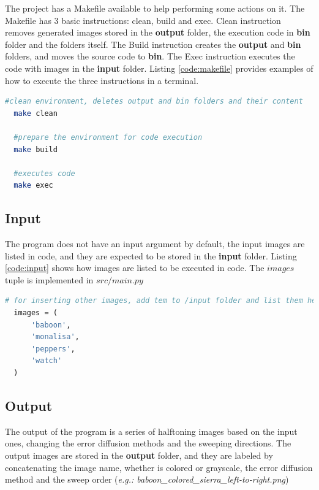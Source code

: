 \documentclass[]{IEEEtran}
\begin{document}
The project has a Makefile available to help performing some actions on it. The Makefile has 3 basic instructions: clean, build and exec. Clean instruction removes generated images stored in the \textbf{output} folder, the execution code in \textbf{bin} folder and the folders itself. The Build instruction creates the \textbf{output} and \textbf{bin} folders, and moves the source code to \textbf{bin}. The Exec instruction executes the code with images in the \textbf{input} folder. Listing \ref{code:makefile} provides examples of how to execute the three instructions in a terminal.
\begin{lstlisting}[language=sh, caption={Makefile usage example}, label={code:makefile}]
  #clean environment, deletes output and bin folders and their content
  make clean
  
  #prepare the environment for code execution
  make build 

  #executes code
  make exec
\end{lstlisting}

\subsection{Input}

The program does not have an input argument by default, the input images are listed in code, and they are expected to be stored in the \textbf{input} folder. Listing \ref{code:input} shows how images are listed to be executed in code. The $images$ tuple is implemented in $src/main.py$

\begin{lstlisting}[language=Python, caption={Input images inside code}, label={code:input}]
  # for inserting other images, add tem to /input folder and list them here
  images = (
      'baboon',
      'monalisa',
      'peppers',
      'watch'
  )
\end{lstlisting}

\subsection{Output}
The output of the program is a series of halftoning images based on the input ones, changing the error diffusion methods and the sweeping directions. The output images are stored in the \textbf{output} folder, and they are labeled by concatenating the image name, whether is colored or grayscale, the error diffusion method and the sweep order (\textit{e.g.: baboon\_colored\_sierra\_left-to-right.png})
\end{document}
